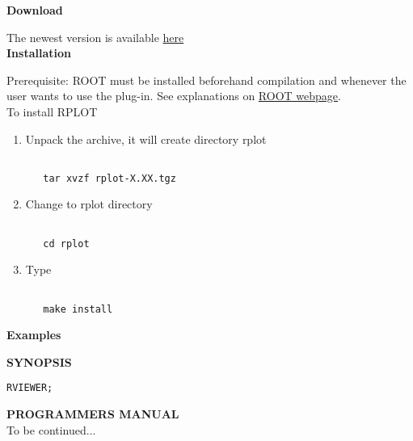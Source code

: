 \textbf{ Download } 

 The newest version is available \href{download/}{ here }\\

\textbf{ Installation }

Prerequisite: ROOT must be installed beforehand compilation and whenever the user wants to use the plug-in. See explanations on  \href{http://root.cern.ch}{ROOT webpage}.  \\

 To install RPLOT 
\begin{enumerate}
	\item  Unpack the archive, it will create directory rplot    
\begin{verbatim}

   tar xvzf rplot-X.XX.tgz
   \end{verbatim}
	\item Change to rplot directory    
\begin{verbatim}

   cd rplot
   \end{verbatim}
	\item Type     
\begin{verbatim}

   make install
   \end{verbatim}
\end{enumerate}

\textbf{ Examples}


\textbf{SYNOPSIS}
\begin{verbatim}
RVIEWER; 
\end{verbatim}




\textbf{ PROGRAMMERS MANUAL  } \\

 To be continued... 
